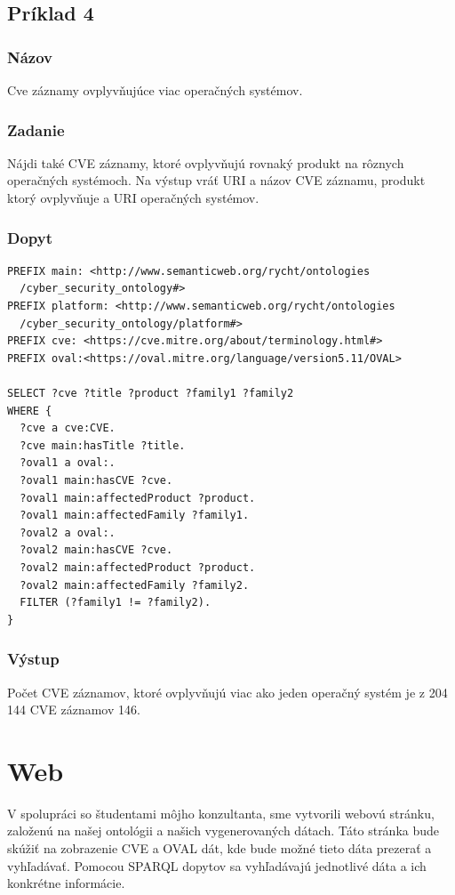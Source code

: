 \documentclass[12pt, a4paper, oneside]{book}
\begin{document}
\subsection*{Príklad 4}
\label{sec:priklad4}
\subsubsection*{Názov}
Cve záznamy ovplyvňujúce viac operačných systémov.


\subsubsection*{Zadanie}
Nájdi také CVE záznamy, ktoré ovplyvňujú rovnaký produkt na rôznych operačných systémoch. Na výstup vráť URI a názov CVE záznamu, produkt ktorý ovplyvňuje a URI operačných systémov.


\subsubsection*{Dopyt}
\begin{verbatim}
PREFIX main: <http://www.semanticweb.org/rycht/ontologies
  /cyber_security_ontology#>
PREFIX platform: <http://www.semanticweb.org/rycht/ontologies
  /cyber_security_ontology/platform#>
PREFIX cve: <https://cve.mitre.org/about/terminology.html#>
PREFIX oval:<https://oval.mitre.org/language/version5.11/OVAL>

SELECT ?cve ?title ?product ?family1 ?family2
WHERE {
  ?cve a cve:CVE.
  ?cve main:hasTitle ?title.
  ?oval1 a oval:.
  ?oval1 main:hasCVE ?cve.
  ?oval1 main:affectedProduct ?product.
  ?oval1 main:affectedFamily ?family1.
  ?oval2 a oval:.
  ?oval2 main:hasCVE ?cve.
  ?oval2 main:affectedProduct ?product.
  ?oval2 main:affectedFamily ?family2.
  FILTER (?family1 != ?family2).
} 
\end{verbatim}


\subsubsection*{Výstup}
Počet CVE záznamov, ktoré ovplyvňujú viac ako jeden operačný systém je z 204 144 CVE záznamov 146.



\section{Web}
V spolupráci so študentami môjho konzultanta, sme vytvorili webovú stránku, založenú na našej ontológii a našich vygenerovaných dátach. Táto stránka bude skúžiť na zobrazenie CVE a OVAL dát, kde bude možné tieto dáta prezerať a vyhľadávať. Pomocou SPARQL dopytov sa vyhľadávajú jednotlivé dáta a ich konkrétne informácie.
\end{document}
